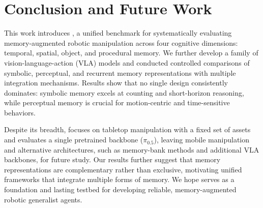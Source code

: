 \section{Conclusion and Future Work}

This work introduces \benchname, a unified benchmark for systematically evaluating memory-augmented robotic manipulation across four cognitive dimensions: temporal, spatial, object, and procedural memory. We further develop a family of vision-language-action (VLA) models and conducted controlled comparisons of symbolic, perceptual, and recurrent memory representations with multiple integration mechanisms. Results show that no single design consistently dominates: symbolic memory excels at counting and short-horizon reasoning, while perceptual memory is crucial for motion-centric and time-sensitive behaviors. 


Despite its breadth, \benchname\xspace focuses on tabletop manipulation with a fixed set of assets and evaluates a single pretrained backbone ($\pi_{0.5}$), leaving mobile manipulation and alternative architectures, such as memory-bank methods and additional VLA backbones, for future study. Our results further suggest that memory representations are complementary rather than exclusive, motivating unified frameworks that integrate multiple forms of memory. We hope \benchname\xspace serves as a foundation and lasting testbed for developing reliable, memory-augmented robotic generalist agents.